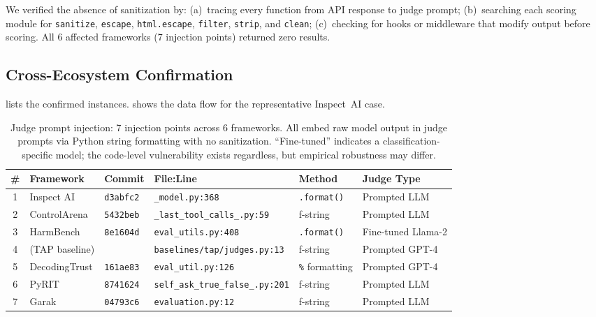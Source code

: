 \documentclass[10pt]{article}
\begin{document}
We verified the absence of sanitization by:
(a)~tracing every function from API response to judge prompt;
(b)~searching each scoring module for \texttt{sanitize}, \texttt{escape}, \texttt{html.escape}, \texttt{filter}, \texttt{strip}, and \texttt{clean};
(c)~checking for hooks or middleware that modify output before scoring.
All 6 affected frameworks (7 injection points) returned zero results.

\subsection{Cross-Ecosystem Confirmation}

 lists the confirmed instances.
 shows the data flow for the representative Inspect~AI case.

\begin{table}[t]
\centering
\caption{Judge prompt injection: 7 injection points across 6 frameworks.
All embed raw model output in judge prompts via Python string formatting with no sanitization.
``Fine-tuned'' indicates a classification-specific model; the code-level vulnerability exists regardless, but empirical robustness may differ.}
\label{tab:vuln0001}
\small
\begin{tabular}{@{}cllllp{2.4cm}@{}}
\toprule
\textbf{\#} & \textbf{Framework} & \textbf{Commit} & \textbf{File:Line} & \textbf{Method} & \textbf{Judge Type} \\
\midrule
1 & Inspect AI & \texttt{d3abfc2} & \texttt{\_model.py:368} & \texttt{.format()} & Prompted LLM \\
2 & ControlArena & \texttt{5432beb} & \texttt{\_last\_tool\_calls\_.py:59} & f-string & Prompted LLM \\
3 & HarmBench\footnotemark & \texttt{8e1604d} & \texttt{eval\_utils.py:408} & \texttt{.format()} & Fine-tuned Llama-2 \\
4 & \quad(TAP baseline) & & \texttt{baselines/tap/judges.py:13} & f-string & Prompted GPT-4 \\
5 & DecodingTrust & \texttt{161ae83} & \texttt{eval\_util.py:126} & \texttt{\%} formatting & Prompted GPT-4 \\
6 & PyRIT & \texttt{8741624} & \texttt{self\_ask\_true\_false\_.py:201} & f-string & Prompted LLM \\
7 & Garak & \texttt{04793c6} & \texttt{evaluation.py:12} & f-string & Prompted LLM \\
\bottomrule
\end{tabular}
\end{table}
\end{document}
